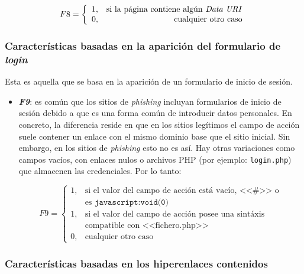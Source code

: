\begin{itemize}
	\[F8 = \left\{ \begin{array}{lr} 1, & \text{si la página contiene algún \textit{Data URI}}\\ 
	0, & \text{\raggedright cualquier otro caso} \label{eqn:phishing_f8} \end{array} \right. \]
	\end{itemize}

\subsubsection{Características basadas en la aparición del formulario de \textit{login}}
Esta es aquella que se basa en la aparición de un formulario de inicio de sesión.

\begin{itemize}
	\item \textit{\textbf{F9}}: es común que los sitios de \textit{phishing} incluyan formularios de inicio de sesión debido a que es una forma común de introducir datos personales. En concreto, la diferencia reside en que en los sitios legítimos el campo de acción suele contener un enlace con el mismo dominio base que el sitio inicial. Sin embargo, en los sitios de \textit{phishing} esto no es así. Hay otras variaciones como campos vacíos, con enlaces nulos o archivos PHP (por ejemplo: \texttt{login.php}) que almacenen las credenciales. Por lo tanto:

	\[F9 = \left\{ \begin{array}{lr} 1, & \text{si el valor del campo de acción está vacío, <<\#>> o}\\ & \text{es } \texttt{javascript:void(0)}\\ 
	1, & \text{si el valor del campo de acción posee una sintáxis} \\ &  \text{compatible con <<fichero.php>>} \\
	0, & \text{cualquier otro caso} \label{eqn:phishing_f9} \end{array} \right. \]
\end{itemize}

\subsubsection{Características basadas en los hiperenlaces contenidos}

